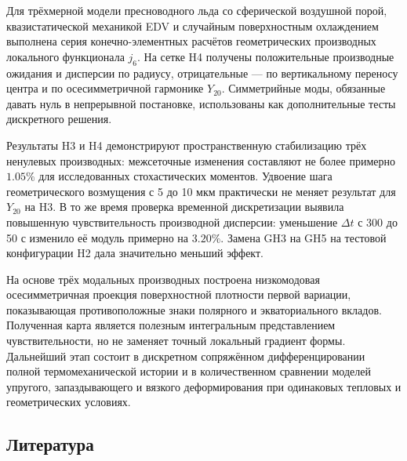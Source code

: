 \documentclass[
]{article}
\begin{document}
Для трёхмерной модели пресноводного льда со сферической воздушной порой,
квазистатической механикой EDV и случайным поверхностным охлаждением
выполнена серия конечно-элементных расчётов геометрических производных
локального функционала \(j_6\). На сетке H4 получены положительные
производные ожидания и дисперсии по радиусу, отрицательные --- по
вертикальному переносу центра и по осесимметричной гармонике \(Y_{20}\).
Симметрийные моды, обязанные давать нуль в непрерывной постановке,
использованы как дополнительные тесты дискретного решения.

Результаты H3 и H4 демонстрируют пространственную стабилизацию трёх
ненулевых производных: межсеточные изменения составляют не более
примерно \(1.05\%\) для исследованных стохастических моментов. Удвоение
шага геометрического возмущения с 5 до 10 мкм практически не меняет
результат для \(Y_{20}\) на H3. В то же время проверка временной
дискретизации выявила повышенную чувствительность производной дисперсии:
уменьшение \(\Delta t\) с 300 до 50 с изменило её модуль примерно на
\(3.20\%\). Замена GH3 на GH5 на тестовой конфигурации H2 дала
значительно меньший эффект.

На основе трёх модальных производных построена низкомодовая
осесимметричная проекция поверхностной плотности первой вариации,
показывающая противоположные знаки полярного и экваториального вкладов.
Полученная карта является полезным интегральным представлением
чувствительности, но не заменяет точный локальный градиент формы.
Дальнейший этап состоит в дискретном сопряжённом дифференцировании
полной термомеханической истории и в количественном сравнении моделей
упругого, запаздывающего и вязкого деформирования при одинаковых
тепловых и геометрических условиях.

\subsection{Литература}\label{ux43bux438ux442ux435ux440ux430ux442ux443ux440ux430}
\end{document}
